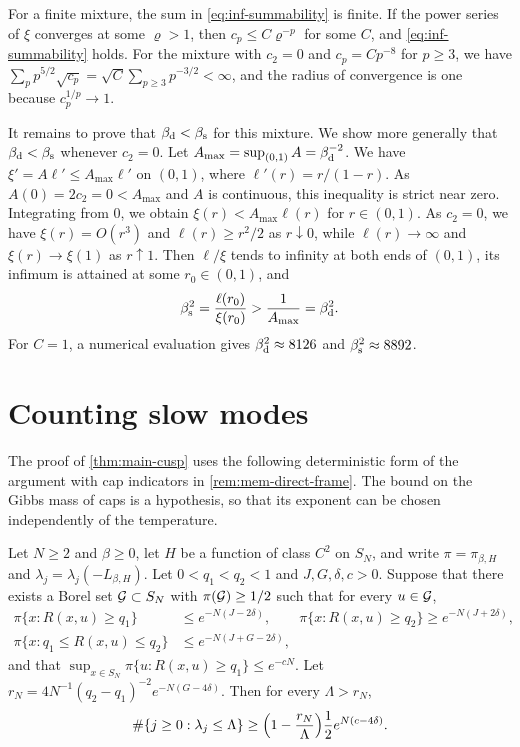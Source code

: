 \begin{remark}\label{rem:inf-gap}
For a finite mixture, the sum in \eqref{eq:inf-summability} is finite. If the power series of $\xi$ converges at some $\varrho>1$, then $c_p\le C\varrho^{-p}$ for some $C$, and \eqref{eq:inf-summability} holds. For the mixture with $c_2=0$ and $c_p=Cp^{-8}$ for $p\ge3$, we have $\sum_pp^{5/2}\sqrt{c_p}=\sqrt C\sum_{p\ge3}p^{-3/2}<\infty$, and the radius of convergence is one because $c_p^{1/p}\to1$.

It remains to prove that $\beta_{\mathrm d}<\beta_{\mathrm s}$ for this mixture. We show more generally that $\beta_{\mathrm d}<\beta_{\mathrm s}$ whenever $c_2=0$. Let $A_{\max}=\sup_{(0,1)}A=\beta_{\mathrm d}^{-2}$. We have $\xi'=A\ell'\le A_{\max}\ell'$ on $(0,1)$, where $\ell'(r)=r/(1-r)$. As $A(0)=2c_2=0<A_{\max}$ and $A$ is continuous, this inequality is strict near zero. Integrating from $0$, we obtain $\xi(r)<A_{\max}\ell(r)$ for $r\in(0,1)$. As $c_2=0$, we have $\xi(r)=O(r^3)$ and $\ell(r)\ge r^2/2$ as $r\downarrow0$, while $\ell(r)\to\infty$ and $\xi(r)\to\xi(1)$ as $r\uparrow1$. Then $\ell/\xi$ tends to infinity at both ends of $(0,1)$, its infimum is attained at some $r_0\in(0,1)$, and
\begin{equation*}
\beta_{\mathrm s}^2=\frac{\ell(r_0)}{\xi(r_0)}>\frac1{A_{\max}}=\beta_{\mathrm d}^2.
\end{equation*}
For $C=1$, a numerical evaluation gives $\beta_{\mathrm d}^2\approx8126$ and $\beta_{\mathrm s}^2\approx8892$.
\end{remark}

\section{Counting slow modes}

The proof of \cref{thm:main-cusp} uses the following deterministic form of the argument with cap indicators in \cref{rem:mem-direct-frame}. The bound on the Gibbs mass of caps is a hypothesis, so that its exponent can be chosen independently of the temperature.

\begin{lemma}\label{lem:inf-frame}
Let $N\ge2$ and $\beta\ge0$, let $H$ be a function of class $C^2$ on $S_N$, and write $\pi=\pi_{\beta,H}$ and $\lambda_j=\lambda_j(-L_{\beta,H})$. Let $0<q_1<q_2<1$ and $J,G,\delta,c>0$. Suppose that there exists a Borel set $\mathcal G\subset S_N$ with $\pi(\mathcal G)\ge1/2$ such that for every $u\in\mathcal G$,
\begin{equation}\label{eq:inf-frame-hyp}
\begin{aligned}
\pi\{x:R(x,u)\ge q_1\}&\le e^{-N(J-2\delta)},\qquad\pi\{x:R(x,u)\ge q_2\}\ge e^{-N(J+2\delta)},\\
\pi\{x:q_1\le R(x,u)\le q_2\}&\le e^{-N(J+G-2\delta)},
\end{aligned}
\end{equation}
and that $\sup_{x\in S_N}\pi\{u:R(x,u)\ge q_1\}\le e^{-cN}$. Let $r_N=4N^{-1}(q_2-q_1)^{-2}e^{-N(G-4\delta)}$. Then for every $\Lambda>r_N$,
\begin{equation}\label{eq:inf-frame}
\#\{j\ge0:\lambda_j\le\Lambda\}\ge\Bigl(1-\frac{r_N}\Lambda\Bigr)\frac12e^{N(c-4\delta)}.
\end{equation}
\end{lemma}

